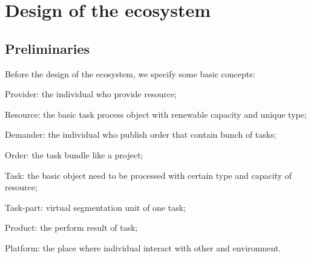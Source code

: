 \section{Design of the ecosystem} %
\label{sec:design_of_the_ecosystem}
\subsection{Preliminaries} %
\label{sub:preliminaries}
Before the design of the ecosystem, we specify some basic concepts: 
\begin{compactitem}
	\item Provider: the individual who provide resource;
	\item Resource: the basic task process object with renewable capacity and unique type;
	\item Demander: the individual who publish order that contain bunch of tasks;
	\item Order: the task bundle like a project;
	\item Task: the basic object need to be processed with certain type and capacity of resource;
	\item Task-part: virtual segmentation unit of one task;
	\item Product: the perform result of task;
	\item Platform: the place where individual interact with other and environment.
\end{compactitem}

